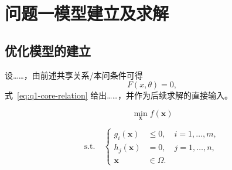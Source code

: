 \section{问题一模型建立及求解}


\subsection{优化模型的建立}

设……，由前述共享关系/本问条件可得
\begin{equation}
    F(x,\theta)=0,
    \label{eq:q1-core-relation}
\end{equation}
式~\eqref{eq:q1-core-relation} 给出……，并作为后续求解的直接输入。


\begin{equation}
    \min_{\mathbf{x}} f(\mathbf{x})
    \label{eq:q1-objective}
\end{equation}

\begin{equation}
\text{s.t.}\quad
\left\{
\begin{aligned}
    g_i(\mathbf{x}) &\le 0, \quad i=1,\ldots,m, \\
    h_j(\mathbf{x}) &= 0, \quad j=1,\ldots,n, \\
    \mathbf{x} &\in \Omega .
\end{aligned}
\right.
\label{eq:q1-constraints}
\end{equation}

